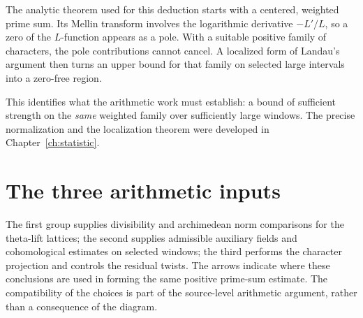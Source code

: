 \documentclass[11pt,openany,oneside]{scrbook}
\theoremstyle{definition}
\theoremstyle{remark}
\begin{document}
The analytic theorem used for this deduction starts with a centered, weighted prime sum. Its Mellin transform involves the logarithmic derivative $-L'/L$, so a zero of the $L$-function appears as a pole. With a suitable positive family of characters, the pole contributions cannot cancel. A localized form of Landau's argument then turns an upper bound for that family on selected large intervals into a zero-free region.

This identifies what the arithmetic work must establish: a bound of sufficient strength on the \emph{same} weighted family over sufficiently large windows. The precise normalization and the localization theorem were developed in Chapter~\ref{ch:statistic}.

\section*{The three arithmetic inputs}

The first group supplies divisibility and archimedean norm comparisons for the theta-lift lattices; the second supplies admissible auxiliary fields and cohomological estimates on selected windows; the third performs the character projection and controls the residual twists. The arrows indicate where these conclusions are used in forming the same positive prime-sum estimate. The compatibility of the choices is part of the source-level arithmetic argument, rather than a consequence of the diagram.
\end{document}
